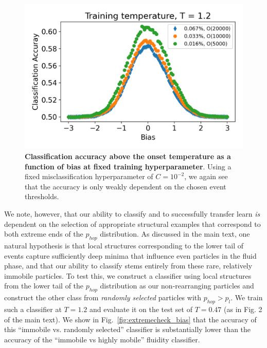 \documentclass[aps,reprint,superscriptaddress,nofootinbib, notitlepage,prl]{revtex4-2}
\begin{document}
\begin{figure}[ht]
\centering
    \includegraphics[width =1.0\linewidth]{SM_Cutoff_test_2.png}
    \caption{\textbf{Classification accuracy above the onset temperature as a function of bias at fixed training hyperparameter}. Using a fixed misclassification hyperparameter of $C=10^{-2}$, we again see that the accuracy is only weakly dependent on the chosen event thresholds.}
    \label{fig:thresholdplot_bias}
\end{figure} 

We note, however, that our ability to classify and to successfully transfer learn \emph{is} dependent on the selection of appropriate structural examples that correspond to both extreme ends of the $p_{hop}$ distribution. As discussed in the main text, one natural hypothesis is that local structures corresponding to the lower tail of events capture sufficiently deep minima that influence even particles in the fluid phase, and that our ability to classify stems entirely from these rare, relatively immobile particles. To test this, we construct a classifier using local structures from the lower tail of the $p_{hop}$ distribution as our non-rearranging particles and construct the other class from \emph{randomly selected} particles with $p_{hop}>p_l$. We train such a classifier at $T=1.2$ and evaluate it on the test set of $T=0.47$ (as in Fig. 2 of the main text). We show in Fig.~\ref{fig:extremecheck_bias} that the accuracy of this ``immobile vs. randomly selected'' classifier is substantially lower than the accuracy of the ``immobile vs highly mobile'' fluidity classifier. 
\end{document}
